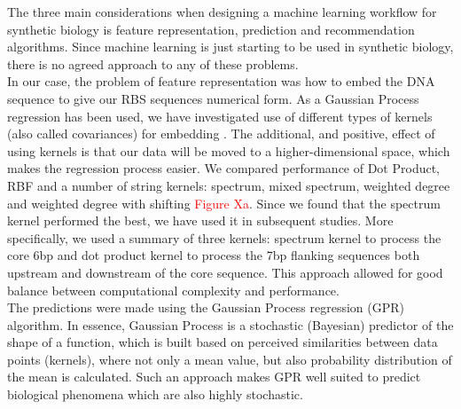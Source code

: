 \documentclass{article}
\begin{document}
The three main considerations when designing a machine learning workflow for synthetic biology is feature representation, prediction and recommendation algorithms.
Since machine learning is just starting to be used in synthetic biology, there is no agreed approach to any of these problems.\\
In our case, the problem of feature representation was how to embed the DNA sequence to give our RBS sequences numerical form. 
As a Gaussian Process regression has been used, we have investigated use of different types of kernels (also called covariances) for embedding \cite{Ben-Hur2008}. 
The additional, and positive, effect of using kernels is that our data will be moved to a higher-dimensional space, which makes the regression process easier. 
We compared performance of Dot Product, RBF and a number of string kernels: spectrum, mixed spectrum, weighted degree and weighted degree with shifting \textcolor{red}{Figure Xa}. 
Since we found that the spectrum kernel performed the best, we have used it in subsequent studies.
More specifically, we used a summary of three kernels: spectrum kernel to process the core 6bp and dot product kernel to process the 7bp flanking sequences both upstream and downstream of the core sequence.
This approach allowed for good balance between computational complexity and performance.\\

The predictions were made using the Gaussian Process regression (GPR) algorithm. 
In essence, Gaussian Process is a stochastic (Bayesian) predictor of the shape of a function, which is built based on perceived similarities between data points (kernels), where not only a mean value, but also probability distribution of the mean is calculated. 
Such an approach makes GPR well suited to predict biological phenomena which are also highly stochastic. \\
\end{document}

